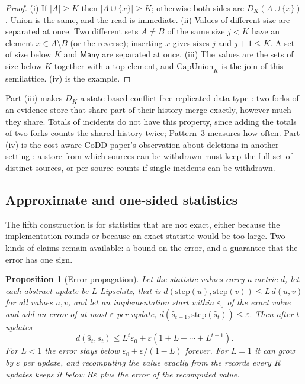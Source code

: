 \documentclass[11pt]{article}
\newcommand{\Many}{\mathsf{Many}}
\newcommand{\step}{\mathrm{step}}
\theoremstyle{definition}
\theoremstyle{plain}
\newtheorem{proposition}[definition]{Proposition}
\begin{document}
\begin{proof}
(i) If $|A|\ge K$ then $|A\cup\{x\}|\ge K$; otherwise both sides are $D_K(A\cup\{x\})$. Union is the
same, and the read is immediate. (ii) Values of different size are separated at once. Two different
sets $A\ne B$ of the same size $j<K$ have an element $x\in A\setminus B$ (or the reverse); inserting
$x$ gives sizes $j$ and $j+1\le K$. A set of size below $K$ and $\Many$ are separated at once.
(iii) The values are the sets of size below $K$ together with a top element, and
$\mathrm{CapUnion}_K$ is the join of this semilattice. (iv) is the example.
\end{proof}

Part (iii) makes $D_K$ a state-based conflict-free replicated data type \cite{crdt}: two forks of
an evidence store that share part of their history merge exactly, however much they share. Totals
of incidents do not have this property, since adding the totals of two forks counts the shared
history twice; Pattern~3 measures how often. Part (iv) is the cost-aware CoDD paper's observation
about deletions in another setting \cite[Section~6.2]{codd}: a store from which sources can be
withdrawn must keep the full set of distinct sources, or per-source counts if single incidents can
be withdrawn.

\subsection{Approximate and one-sided statistics}\label{sec:c5}

The fifth construction is for statistics that are not exact, either because the implementation
rounds or because an exact statistic would be too large. Two kinds of claims remain available: a
bound on the error, and a guarantee that the error has one sign.

\begin{proposition}[Error propagation]\label{prop:error}
Let the statistic values carry a metric $d$, let each abstract update be $L$-Lipschitz, that is
$d(\step(u),\step(v))\le L\,d(u,v)$ for all values $u,v$, and let an
implementation start within $\varepsilon_0$ of the exact value and add an error of at most
$\varepsilon$ per update, $d(\hat s_{t+1},\step(\hat s_t))\le\varepsilon$. Then after $t$ updates
\[
d(\hat s_t,s_t)\le L^t\varepsilon_0+\varepsilon(1+L+\cdots+L^{t-1}).
\]
For $L<1$ the error stays below $\varepsilon_0+\varepsilon/(1-L)$ forever. For $L=1$ it can grow by
$\varepsilon$ per update, and recomputing the value exactly from the records every $R$ updates keeps
it below $R\varepsilon$ plus the error of the recomputed value.
\end{proposition}
\end{document}
